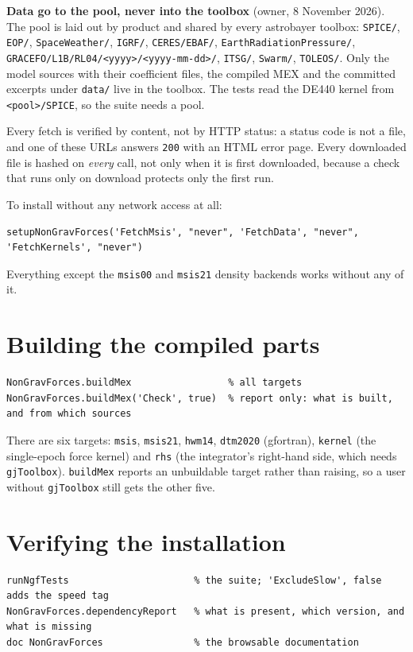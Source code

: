 \documentclass[11pt,a4paper]{report}
\begin{document}
\noindent \textbf{Data go to the pool, never into the toolbox} (owner, 8 November 2026). The pool is
laid out by product and shared by every astrobayer toolbox: \texttt{SPICE/}, \texttt{EOP/},
\texttt{SpaceWeather/}, \texttt{IGRF/}, \texttt{CERES/EBAF/}, \texttt{EarthRadiationPressure/},
\texttt{GRACEFO/L1B/RL04/<yyyy>/<yyyy-mm-dd>/}, \texttt{ITSG/}, \texttt{Swarm/}, \texttt{TOLEOS/}. Only
the model sources with their coefficient files, the compiled MEX and the committed excerpts under
\texttt{data/} live in the toolbox. The tests read the DE440 kernel from \texttt{<pool>/SPICE}, so the
suite needs a pool.

\noindent Every fetch is verified by content, not by HTTP status: a status code is not a file, and
one of these URLs answers \texttt{200} with an HTML error page. Every downloaded file is hashed on
\emph{every} call, not only when it is first downloaded, because a check that runs only on download
protects only the first run.

To install without any network access at all:

\begin{lstlisting}
setupNonGravForces('FetchMsis', "never", 'FetchData', "never", 'FetchKernels', "never")
\end{lstlisting}

\noindent Everything except the \texttt{msis00} and \texttt{msis21} density backends works without
any of it.

\section{Building the compiled parts}
\begin{lstlisting}
NonGravForces.buildMex                 % all targets
NonGravForces.buildMex('Check', true)  % report only: what is built, and from which sources
\end{lstlisting}

\noindent There are six targets: \texttt{msis}, \texttt{msis21}, \texttt{hwm14}, \texttt{dtm2020}
(gfortran), \texttt{kernel} (the single-epoch force kernel) and \texttt{rhs} (the integrator's
right-hand side, which needs \texttt{gjToolbox}). \texttt{buildMex} reports an unbuildable target
rather than raising, so a user without \texttt{gjToolbox} still gets the other five.

\section{Verifying the installation}
\begin{lstlisting}
runNgfTests                      % the suite; 'ExcludeSlow', false adds the speed tag
NonGravForces.dependencyReport   % what is present, which version, and what is missing
doc NonGravForces                % the browsable documentation
\end{lstlisting}
\end{document}
